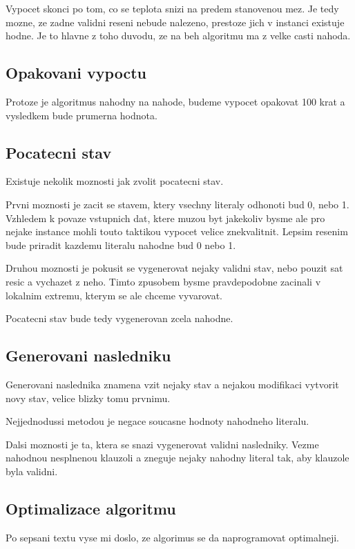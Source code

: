 \documentclass[12pt,a4paper]{article}
\begin{document}
Vypocet skonci po tom, co se teplota snizi na predem stanovenou mez. Je tedy mozne, ze zadne validni reseni nebude nalezeno, prestoze jich v instanci existuje hodne. Je to hlavne z toho duvodu, ze na beh algoritmu ma z velke casti nahoda.


\subsection{Opakovani vypoctu}

Protoze je algoritmus nahodny na nahode, budeme vypocet opakovat 100 krat a vysledkem bude prumerna hodnota.


\subsection{Pocatecni stav}
Existuje nekolik moznosti jak zvolit pocatecni stav.

Prvni moznosti je zacit se stavem, ktery vsechny literaly odhonoti bud 0, nebo 1. Vzhledem k povaze vstupnich dat, ktere muzou byt jakekoliv bysme ale pro nejake instance mohli touto taktikou vypocet velice znekvalitnit. Lepsim resenim bude priradit kazdemu literalu nahodne bud 0 nebo 1.

Druhou moznosti je pokusit se vygenerovat nejaky validni stav, nebo pouzit sat resic a vychazet z neho. Timto zpusobem bysme pravdepodobne zacinali v lokalnim extremu, kterym se ale chceme vyvarovat.

Pocatecni stav bude tedy vygenerovan zcela nahodne.

\subsection{Generovani nasledniku}
Generovani naslednika znamena vzit nejaky stav a nejakou modifikaci vytvorit novy stav, velice blizky tomu prvnimu.

Nejjednodussi metodou je negace soucasne hodnoty nahodneho literalu.

Dalsi moznosti je ta, ktera se snazi vygenerovat validni nasledniky. Vezme nahodnou nesplnenou klauzoli a zneguje nejaky nahodny literal tak, aby klauzole byla validni.


\subsection{Optimalizace algoritmu}

Po sepsani textu vyse mi doslo, ze algorimus se da naprogramovat optimalneji. 
\end{document}
